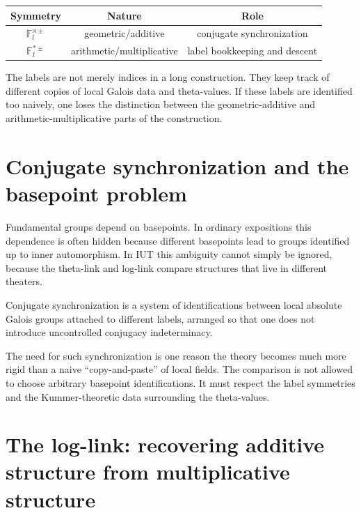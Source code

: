 \begin{center}
\begin{tabular}{c|c|c}
\toprule
Symmetry & Nature & Role \\
\midrule
\(\mathbb F_l^{\rtimes\pm}\) & geometric/additive & conjugate synchronization \\
\(\mathbb F_l^{\ast\pm}\) & arithmetic/multiplicative & label bookkeeping and descent \\
\bottomrule
\end{tabular}
\end{center}

\begin{remark}
The labels are not merely indices in a long construction.  They keep track of different copies of local Galois data and theta-values.  If these labels are identified too naively, one loses the distinction between the geometric-additive and arithmetic-multiplicative parts of the construction.
\end{remark}

\section{Conjugate synchronization and the basepoint problem}

Fundamental groups depend on basepoints.  In ordinary expositions this dependence is often hidden because different basepoints lead to groups identified up to inner automorphism.  In IUT this ambiguity cannot simply be ignored, because the theta-link and log-link compare structures that live in different theaters.

\begin{definition}
Conjugate synchronization is a system of identifications between local absolute Galois groups attached to different labels, arranged so that one does not introduce uncontrolled conjugacy indeterminacy.
\end{definition}

The need for such synchronization is one reason the theory becomes much more rigid than a naive ``copy-and-paste'' of local fields.  The comparison is not allowed to choose arbitrary basepoint identifications.  It must respect the label symmetries and the Kummer-theoretic data surrounding the theta-values.

\section{The log-link: recovering additive structure from multiplicative structure}

